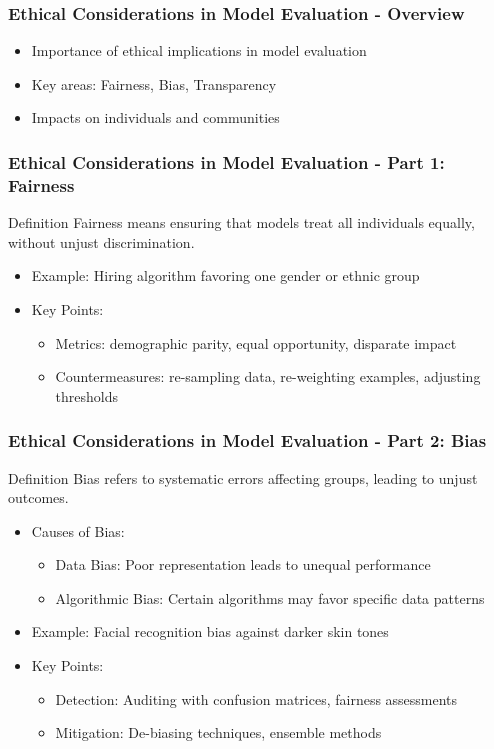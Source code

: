 \documentclass[aspectratio=169]{beamer}
\begin{document}
\begin{frame}[fragile]
    \frametitle{Ethical Considerations in Model Evaluation - Overview}
    \begin{itemize}
        \item Importance of ethical implications in model evaluation
        \item Key areas: Fairness, Bias, Transparency
        \item Impacts on individuals and communities
    \end{itemize}
\end{frame}

\begin{frame}[fragile]
    \frametitle{Ethical Considerations in Model Evaluation - Part 1: Fairness}
    \begin{block}{Definition}
        Fairness means ensuring that models treat all individuals equally, without unjust discrimination.
    \end{block}
    \begin{itemize}
        \item Example: Hiring algorithm favoring one gender or ethnic group
        \item Key Points:
            \begin{itemize}
                \item Metrics: demographic parity, equal opportunity, disparate impact
                \item Countermeasures: re-sampling data, re-weighting examples, adjusting thresholds
            \end{itemize}
    \end{itemize}
\end{frame}

\begin{frame}[fragile]
    \frametitle{Ethical Considerations in Model Evaluation - Part 2: Bias}
    \begin{block}{Definition}
        Bias refers to systematic errors affecting groups, leading to unjust outcomes.
    \end{block}
    \begin{itemize}
        \item Causes of Bias:
            \begin{itemize}
                \item Data Bias: Poor representation leads to unequal performance
                \item Algorithmic Bias: Certain algorithms may favor specific data patterns
            \end{itemize}
        \item Example: Facial recognition bias against darker skin tones
        \item Key Points:
            \begin{itemize}
                \item Detection: Auditing with confusion matrices, fairness assessments
                \item Mitigation: De-biasing techniques, ensemble methods
            \end{itemize}
    \end{itemize}
\end{frame}
\end{document}
